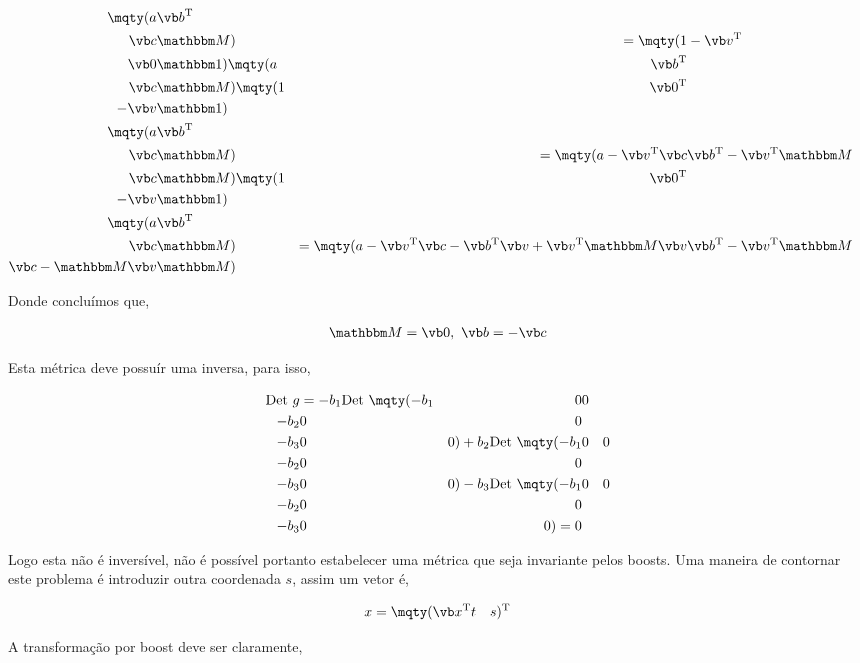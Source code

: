 \documentclass[twoside]{amsart}
\numberwithin{equation}{section}
\begin{document}
\begin{refsection}
\begin{align*}
    \mqty(a&{\vb b}^{\textup T}\\ \vb c&\mathbbm M)&=\mqty(1&-\vb v^{\textup T}\\ \vb 0&\mathbbm 1)\mqty(a&{\vb b}^{\textup T}\\ \vb c&\mathbbm M)\mqty(1&\vb 0^\textup T\\-\vb v&\mathbbm 1)\\
    \mqty(a&{\vb b}^{\textup T}\\ \vb c&\mathbbm M)&=\mqty(a-\vb v^{\textup T}\vb c&\vb b^{\textup T}-\vb v^{\textup T}\mathbbm M\\ \vb c&\mathbbm M)\mqty(1&\vb 0^\textup T\\-\vb v&\mathbbm 1)\\
    \mqty(a&{\vb b}^{\textup T}\\ \vb c&\mathbbm M)&=\mqty(a-\vb v^{\textup T}\vb c-\vb b^{\textup T}\vb v+\vb v^{\textup T}\mathbbm M\vb v&\vb b^{\textup T}-\vb v^{\textup T}\mathbbm M\\ \vb c-\mathbbm M \vb v&\mathbbm M)\\
\end{align*}

Donde concluímos que,

\begin{align}
    \mathbbm M =\vb  0,\ \vb b=-\vb c
\end{align}

Esta métrica deve possuír uma inversa, para isso,

\begin{align}
    \textup{Det } g&=-b_1\textup {Det }\mqty(-b_1&0&0\\-b_2&0&0\\-b_3&0&0)+b_2\textup {Det }\mqty(-b_1&0&0\\-b_2&0&0\\-b_3&0&0)-b_3\textup {Det }\mqty(-b_1&0&0\\-b_2&0&0\\-b_3&0&0)=0
\end{align}

Logo esta não é inversível, não é possível portanto estabelecer uma métrica que seja invariante pelos boosts. Uma maneira de contornar este problema é introduzir outra coordenada $s$, assim um vetor é,

\begin{align}
    x=\mqty(\vb x^{\textup T}&t&s)^{\textup T}
\end{align}

A transformação por boost deve ser claramente,


\end{refsection}
\end{document}
